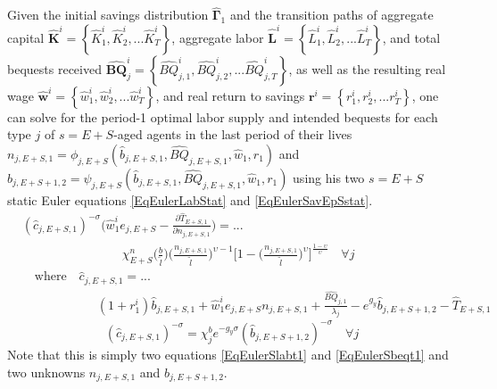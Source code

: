 \documentclass[letterpaper,12pt]{article}
\theoremstyle{definition}
\begin{document}
  Given the initial savings distribution $\bm{\hat{\Gamma}}_1$ and the transition paths of aggregate capital $\bm{\hat{K}}^i = \left\{\hat{K}_1^i,\hat{K}_2^i,...\hat{K}_T^i\right\}$, aggregate labor $\bm{\hat{L}}^i = \left\{\hat{L}_1^i,\hat{L}_2^i,...\hat{L}_T^i\right\}$, and total bequests received $\bm{\hat{BQ}}_j^i = \left\{\hat{BQ}_{j,1}^i,\hat{BQ}_{j,2}^i,...\hat{BQ}_{j,T}^i\right\}$, as well as the resulting real wage $\bm{\hat{w}}^i = \left\{\hat{w}_1^i,\hat{w}_2^i,...\hat{w}_T^i\right\}$, and real return to savings $\bm{r}^i = \left\{r_1^i,r_2^i,...r_T^i\right\}$, one can solve for the period-1 optimal labor supply and intended bequests for each type $j$ of $s=E+S$-aged agents in the last period of their lives $n_{j,E+S,1}=\phi_{j,E+S}(\hat{b}_{j,E+S,1},\hat{BQ}_{j,E+S,1},\hat{w}_1,r_1)$ and $\hat{b}_{j,E+S+1,2}=\psi_{j,E+S}(\hat{b}_{j,E+S,1},\hat{BQ}_{j,E+S,1},\hat{w}_1,r_1)$ using his two $s=E+S$ static Euler equations \eqref{EqEulerLabStat} and \eqref{EqEulerSavEpSstat}.
  \begin{equation}\label{EqEulerSlabt1}
    \begin{split}
      &(\hat{c}_{j,E+S,1})^{-\sigma}\Biggl(\hat{w}_1^i e_{j,E+S} - \frac{\partial\hat{T}_{E+S,1}}{\partial n_{j,E+S,1}}\Biggr) = ... \\
      &\qquad\qquad\qquad\qquad \chi^n_{E+S}\biggl(\frac{b}{\tilde{l}}\biggr)\biggl(\frac{n_{j,E+S,1}}{\tilde{l}}\biggr)^{\upsilon-1}\Biggl[1 - \biggl(\frac{n_{j,E+S,1}}{\tilde{l}}\biggr)^\upsilon\Biggr]^{\frac{1-\upsilon}{\upsilon}} \quad\forall j \\
      &\quad\text{where}\quad \hat{c}_{j,E+S,1} = ... \\
      &\qquad\qquad\qquad \left(1 + r_1^i\right)\hat{b}_{j,E+S,1} + \hat{w}_1^i e_{j,E+S}n_{j,E+S,1} + \frac{\hat{BQ}_{j,1}}{\lambda_j} - e^{g_y}\hat{b}_{j,E+S+1,2} - \hat{T}_{E+S,1}
    \end{split}
  \end{equation}
  \begin{equation}\label{EqEulerSbeqt1}
    (\hat{c}_{j,E+S,1})^{-\sigma} = \chi^b_j e^{-g_y\sigma}(\hat{b}_{j,E+S+1,2})^{-\sigma} \quad\forall j
  \end{equation}
  Note that this is simply two equations \eqref{EqEulerSlabt1} and \eqref{EqEulerSbeqt1} and two unknowns $n_{j,E+S,1}$ and $\hat{b}_{j,E+S+1,2}$.
\end{document}
